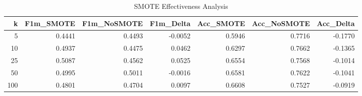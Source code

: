 \begin{table}[htbp]
\centering
\caption{SMOTE Effectiveness Analysis}
\label{tab:table4}
\small
\begin{tabular}{rrrrrrr}
\toprule
k & F1m_SMOTE & F1m_NoSMOTE & F1m_Delta & Acc_SMOTE & Acc_NoSMOTE & Acc_Delta \\
\midrule
5 & 0.4441 & 0.4493 & -0.0052 & 0.5946 & 0.7716 & -0.1770 \\
10 & 0.4937 & 0.4475 & 0.0462 & 0.6297 & 0.7662 & -0.1365 \\
25 & 0.5087 & 0.4562 & 0.0525 & 0.6554 & 0.7568 & -0.1014 \\
50 & 0.4995 & 0.5011 & -0.0016 & 0.6581 & 0.7622 & -0.1041 \\
100 & 0.4801 & 0.4704 & 0.0097 & 0.6608 & 0.7527 & -0.0919 \\
\bottomrule
\end{tabular}
\end{table}
